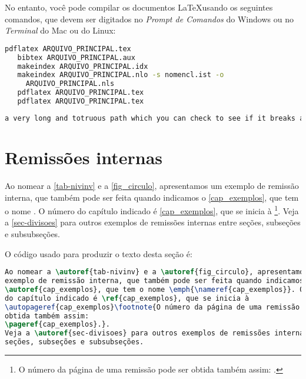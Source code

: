 No entanto, você pode compilar os documentos \LaTeX usando os seguintes
comandos, que devem ser digitados no \emph{Prompt de Comandos} do Windows ou no
\emph{Terminal} do Mac ou do Linux:

\begin{lstlisting}[language=bash,caption={Você pode compilar os documentos \LaTeX usando os seguintes
comandos.},label={lst:compilarLatex}]
   pdflatex ARQUIVO_PRINCIPAL.tex
   bibtex ARQUIVO_PRINCIPAL.aux
   makeindex ARQUIVO_PRINCIPAL.idx
   makeindex ARQUIVO_PRINCIPAL.nlo -s nomencl.ist -o
     ARQUIVO_PRINCIPAL.nls
   pdflatex ARQUIVO_PRINCIPAL.tex
   pdflatex ARQUIVO_PRINCIPAL.tex
\end{lstlisting}

\begin{lstlisting}[language=bash]
a very long and totruous path which you can check to see if it breaks and where at the end of the line
\end{lstlisting}


\section{Remissões internas}

Ao nomear a \autoref{tab-nivinv} e a \autoref{fig_circulo}, apresentamos um
exemplo de remissão interna, que também pode ser feita quando indicamos o
\autoref{cap_exemplos}, que tem o nome \emph{}. O número
do capítulo indicado é \ref{cap_exemplos}, que se inicia à
\footnote{O número da página de uma remissão pode ser
obtida também assim:
\pageref{cap_exemplos}.}.
Veja a \autoref{sec-divisoes} para outros exemplos de remissões internas entre
seções, subseções e subsubseções.

O código usado para produzir o texto desta seção é:

\begin{lstlisting}[language=TeX, caption=TeX example]
Ao nomear a \autoref{tab-nivinv} e a \autoref{fig_circulo}, apresentamos um
exemplo de remissão interna, que também pode ser feita quando indicamos o
\autoref{cap_exemplos}, que tem o nome \emph{\nameref{cap_exemplos}}. O número
do capítulo indicado é \ref{cap_exemplos}, que se inicia à
\autopageref{cap_exemplos}\footnote{O número da página de uma remissão pode ser
obtida também assim:
\pageref{cap_exemplos}.}.
Veja a \autoref{sec-divisoes} para outros exemplos de remissões internas entre
seções, subseções e subsubseções.
\end{lstlisting}

